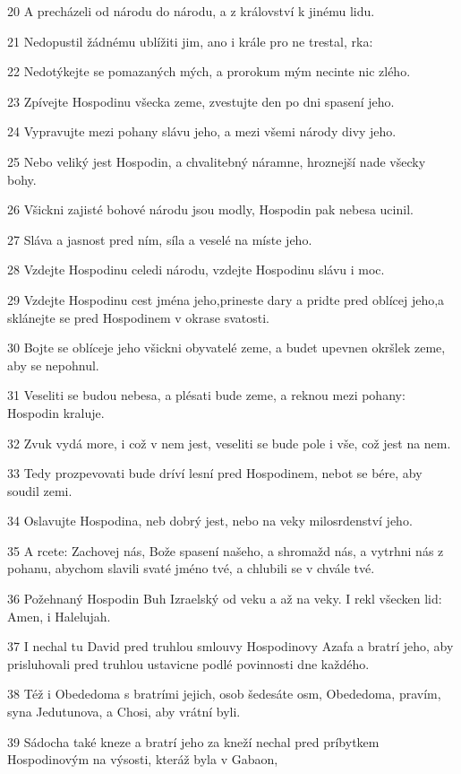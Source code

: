 \par 20 A precházeli od národu do národu, a z království k jinému lidu.
\par 21 Nedopustil žádnému ublížiti jim, ano i krále pro ne trestal, rka:
\par 22 Nedotýkejte se pomazaných mých, a prorokum mým necinte nic zlého.
\par 23 Zpívejte Hospodinu všecka zeme, zvestujte den po dni spasení jeho.
\par 24 Vypravujte mezi pohany slávu jeho, a mezi všemi národy divy jeho.
\par 25 Nebo veliký jest Hospodin, a chvalitebný náramne, hroznejší nade všecky bohy.
\par 26 Všickni zajisté bohové národu jsou modly, Hospodin pak nebesa ucinil.
\par 27 Sláva a jasnost pred ním, síla a veselé na míste jeho.
\par 28 Vzdejte Hospodinu celedi národu, vzdejte Hospodinu slávu i moc.
\par 29 Vzdejte Hospodinu cest jména jeho,prineste dary a pridte pred oblícej jeho,a sklánejte se pred Hospodinem v okrase svatosti.
\par 30 Bojte se oblíceje jeho všickni obyvatelé zeme, a budet upevnen okršlek zeme, aby se nepohnul.
\par 31 Veseliti se budou nebesa, a plésati bude zeme, a reknou mezi pohany: Hospodin kraluje.
\par 32 Zvuk vydá more, i což v nem jest, veseliti se bude pole i vše, což jest na nem.
\par 33 Tedy prozpevovati bude dríví lesní pred Hospodinem, nebot se bére, aby soudil zemi.
\par 34 Oslavujte Hospodina, neb dobrý jest, nebo na veky milosrdenství jeho.
\par 35 A rcete: Zachovej nás, Bože spasení našeho, a shromažd nás, a vytrhni nás z pohanu, abychom slavili svaté jméno tvé, a chlubili se v chvále tvé.
\par 36 Požehnaný Hospodin Buh Izraelský od veku a až na veky. I rekl všecken lid: Amen, i Halelujah.
\par 37 I nechal tu David pred truhlou smlouvy Hospodinovy Azafa a bratrí jeho, aby prisluhovali pred truhlou ustavicne podlé povinnosti dne každého.
\par 38 Též i Obededoma s bratrími jejich, osob šedesáte osm, Obededoma, pravím, syna Jedutunova, a Chosi, aby vrátní byli.
\par 39 Sádocha také kneze a bratrí jeho za kneží nechal pred príbytkem Hospodinovým na výsosti, kteráž byla v Gabaon,
